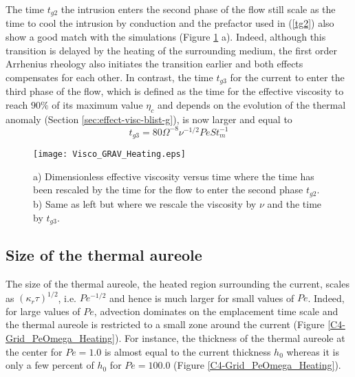 The time  $t_{g2}$ the intrusion enters  the second phase of  the flow
still scale  as the time to  cool the intrusion by  conduction and the
prefactor  used  in  (\ref{tg2})  also  show a  good  match  with  the
simulations (Figure \ref{C4-Visco_GRAV_Heating}  a).  Indeed, although
this transition is  delayed by the heating of  the surrounding medium,
the  first  order Arrhenius  rheology  also  initiates the  transition
earlier and both effects compensates  for each other. In contrast, the
time $t_{g3}$  for the current to  enter the third phase  of the flow,
which is  defined as  the time  for the  effective viscosity  to reach
$90\%$ of its  maximum value $\eta_c$ and depends on  the evolution of
the  thermal anomaly  (Section \ref{sec:effect-visc-blist-g}),  is now
larger and equal to
\begin{equation}
  t_{g3}= 80 \Omega^{-8}\nu^{-1/2}Pe St_m^{-1}
  \label{C4-tg3}
\end{equation}

\begin{figure}
  \begin{center}
    \graphicspath{ {/Users/thorey/Documents/These/Projet/Refroidissement/Skin_Model/Figure/Figure_Heating/} }
    \texttt{[image: Visco\_GRAV\_Heating.eps]}
    \caption{a)  Dimensionless effective  viscosity versus  time where
      the time has been rescaled by the time for the flow to enter the
      second phase $t_{g2}$. b) Same as  left but where we rescale the
      viscosity by $\nu$ and the time by $t_{g3}$.}
    \label{C4-Visco_GRAV_Heating}
  \end{center}
\end{figure}

\subsection{Size of the thermal aureole}
\label{C4-sec:char-therm-anom}

The size  of the  thermal aureole, the  heated region  surrounding the
current,  scales as  $(\kappa_r  \tau)^{1/2}$,  i.e.  $Pe^{-1/2}$  and
hence is  much larger  for small  values of  $Pe$.  Indeed,  for large
values of $Pe$, advection dominates  on the emplacement time scale and
the thermal aureole  is restricted to a small zone  around the current
(Figure  \ref{C4-Grid_PeOmega_Heating}). For  instance, the  thickness of
the thermal aureole at the center  for $Pe=1.0$ is almost equal to the
current thickness $h_0$ whereas it is  only a few percent of $h_0$ for
$Pe=100.0$ (Figure \ref{C4-Grid_PeOmega_Heating}).


